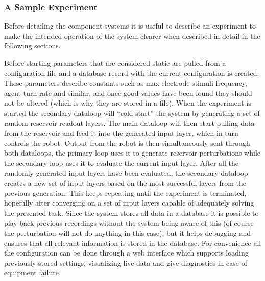 \subsubsection{A Sample Experiment}
Before detailing the component systems it is useful to describe an experiment to
make the intended operation of the system clearer when described in detail in
the following sections.\par
Before starting parameters that are considered static are pulled from a
configuration file and a database record with the current configuration is
created.
These parameters describe constants such as max electrode stimuli frequency,
agent turn rate and similar, and once good values have been found they should
not be altered (which is why they are stored in a file).
When the experiment is started the secondary dataloop will ``cold start'' the
system by generating a set of random reservoir readout layers.
The main dataloop will then start pulling data from the reservoir and feed it
into the generated input layer, which in turn controls the robot.
Output from the robot is then simultaneously sent through both dataloops, the
primary loop uses it to generate reservoir perturbations while the secondary
loop uses it to evaluate the current input layer.
After all the randomly generated input layers have been evaluated, the
secondary dataloop creates a new set of input layers based on the most
successful layers from the previous generation.
This keeps repeating until the experiment is terminated, hopefully after
converging on a set of input layers capable of adequately solving the presented
task.
Since the system stores all data in a database it is possible to play back
previous recordings without the system being aware of this (of course the
perturbation will not do anything in this case), but it helps debugging and
ensures that all relevant information is stored in the database.
For convenience all the configuration can be done through a web interface which
supports loading previously stored settings, visualizing live data and give
diagnostics in case of equipment failure. 
